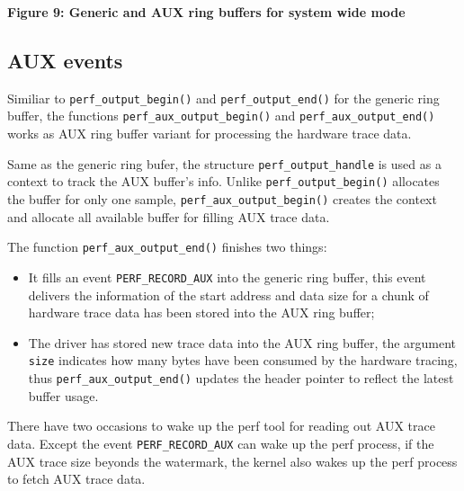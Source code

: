 \documentclass[11pt]{diazessay} %
\def\code#1{\texttt{#1}}
\begin{document}
\begin{center}
\par
\textbf{Figure 9: Generic and AUX ring buffers for system wide mode}
\end{center}

\subsection*{AUX events}

Similiar to \code{perf\_output\_begin()} and \code{perf\_output\_end()} for the generic ring buffer, the functions \code{perf\_aux\_output\_begin()} and \code{perf\_aux\_output\_end()} works as AUX ring buffer variant for processing the hardware trace data.

Same as the generic ring bufer, the structure \code{perf\_output\_handle} is used as a context to track the AUX buffer's info.  Unlike \code{perf\_output\_begin()} allocates the buffer for only one sample, \code{perf\_aux\_output\_begin()} creates the context and allocate all available buffer for filling AUX trace data.

The function \code{perf\_aux\_output\_end()} finishes two things:
\begin{itemize}
	\item It fills an event \code{PERF\_RECORD\_AUX} into the generic ring buffer, this event delivers the information of the start address and data size for a chunk of hardware trace data has been stored into the AUX ring buffer;
	\item The driver has stored new trace data into the AUX ring buffer, the argument \code{size} indicates how many bytes have been consumed by the hardware tracing, thus \code{perf\_aux\_output\_end()} updates the header pointer to reflect the latest buffer usage.
\end{itemize}

There have two occasions to wake up the perf tool for reading out AUX trace data.  Except the event \code{PERF\_RECORD\_AUX} can wake up the perf process, if the AUX trace size beyonds the watermark, the kernel also wakes up the perf process to fetch AUX trace data.
\end{document}
